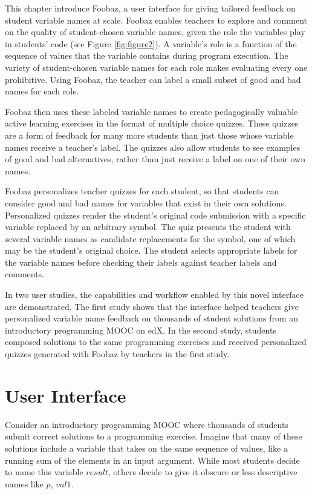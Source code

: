 This chapter introduce Foobaz, a user interface for giving tailored feedback on student variable names at scale. Foobaz enables teachers to explore and comment on the quality of student-chosen variable names, given the role the variables play in students' code (see Figure \ref{fig:figure2}). A variable's role is a function of the sequence of values that the variable contains during program execution. The variety of student-chosen variable names for each role makes evaluating every one prohibitive. Using Foobaz, the teacher can label a small subset of good and bad names for each role. 

Foobaz then uses these labeled variable names to create pedagogically valuable active learning exercises in the format of multiple choice quizzes. These quizzes are a form of feedback for many more students than just those whose variable names receive a teacher's label. The quizzes also allow students to see examples of good and bad alternatives, rather than just receive a label on one of their own names. 

Foobaz personalizes teacher quizzes for each student, so that students can consider good and bad names for variables that exist in their own solutions. Personalized quizzes render the student's original code submission with a specific variable replaced by an arbitrary symbol. The quiz presents the student with several variable names as candidate replacements for the symbol, one of which may be the student's original choice. The student selects appropriate labels for the variable names before checking their labels against teacher labels and comments.

In two user studies, the capabilities and workflow enabled by this novel interface are demonstrated. The first study shows that the interface helped teachers give personalized variable name feedback on thousands of student solutions from an introductory programming MOOC on edX. In the second study, students composed solutions to the same programming exercises and received personalized quizzes generated with Foobaz by teachers in the first study.


\section{User Interface}

Consider an introductory programming MOOC where thousands of students submit correct solutions to a programming exercise. Imagine that many of these solutions include a variable that takes on the same sequence of values, like a running sum of the elements in an input argument. While most students decide to name this variable $result$, others decide to give it obscure or less descriptive names like $p$, $val1$.

